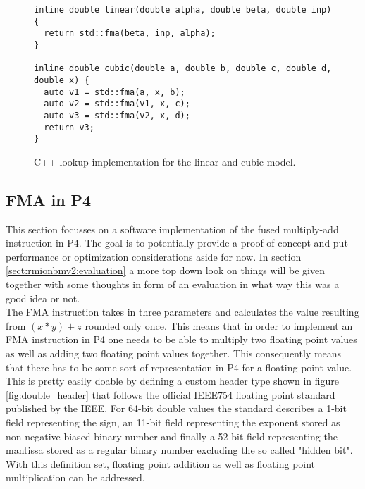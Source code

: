 \captionsetup[figure]{skip=-10pt} %
\begin{figure}[ht]
  \begin{lstlisting}[style=C++, basicstyle=\ttfamily]
inline double linear(double alpha, double beta, double inp) {
  return std::fma(beta, inp, alpha);
}

inline double cubic(double a, double b, double c, double d, double x) {
  auto v1 = std::fma(a, x, b);
  auto v2 = std::fma(v1, x, c);
  auto v3 = std::fma(v2, x, d);
  return v3;
}\end{lstlisting}
  \caption[Linear and Cubic lookup implementation in C++]{ C++ lookup implementation for the linear and cubic model. }
  \label{fig:linear_cubic}
\end{figure}

\subsection{FMA in P4}
\label{sect:rmionbmv2:fma}
This section focusses on a software implementation of the fused multiply-add instruction in P4. The goal is to potentially provide a proof of concept and put performance or optimization considerations aside for now. In section \ref{sect:rmionbmv2:evaluation} a more top down look on things will be given together with some thoughts in form of an evaluation in what way this was a good idea or not.\\

The FMA instruction takes in three parameters and calculates the value resulting from \((x * y) + z\) rounded only once. This means that in order to implement an FMA instruction in P4 one needs to be able to multiply two floating point values as well as adding two floating point values together. This consequently means that there has to be some sort of representation in P4 for a floating point value. This is pretty easily doable by defining a custom header type shown in figure \ref{fig:double_header} that follows the official IEEE754 floating point standard \cite{ieee754} published by the IEEE. For 64-bit double values the standard describes a 1-bit field representing the sign, an 11-bit field representing the exponent stored as non-negative biased binary number and finally a 52-bit field representing the mantissa stored as a regular binary number excluding the so called "hidden bit". With this definition set, floating point addition as well as floating point multiplication can be addressed.\\

